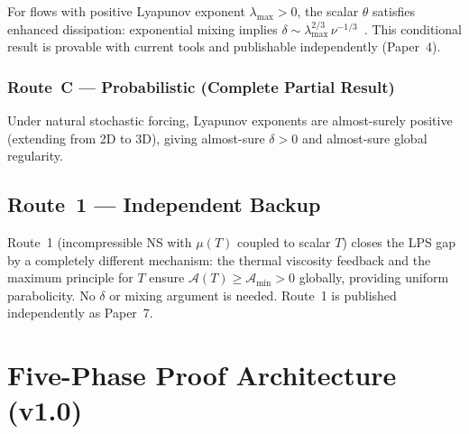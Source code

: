\documentclass[11pt, a4paper]{article}
\theoremstyle{definition}
\theoremstyle{remark}
\newcommand{\Afield}{\mathcal{A}}
\newcommand{\thet}{\theta}
\newcommand{\delt}{\delta}
\begin{document}
For flows with positive Lyapunov exponent $\lambda_{\max} > 0$, the scalar $\thet$
satisfies enhanced dissipation: exponential mixing implies $\delt \sim
\lambda_{\max}^{2/3}\,\nu^{-1/3}$~\cite{czdk2020}. This conditional result
is provable with current tools and publishable independently (Paper~4).

\subsubsection{Route~C --- Probabilistic (Complete Partial Result)}

Under natural stochastic forcing, Lyapunov exponents are almost-surely positive
(extending \cite{bbps2022} from 2D to 3D), giving almost-sure $\delt > 0$
and almost-sure global regularity.

\subsection{Route~1 --- Independent Backup}

Route~1 (incompressible NS with $\mu(T)$ coupled to scalar $T$) closes the LPS gap
by a completely different mechanism: the thermal viscosity feedback and the maximum
principle for $T$ ensure $\Afield(T) \geq \Afield_{\min} > 0$ globally, providing
uniform parabolicity. No $\delt$ or mixing argument is needed.
Route~1 is published independently as Paper~7.

\section{Five-Phase Proof Architecture (v1.0)}
\end{document}

